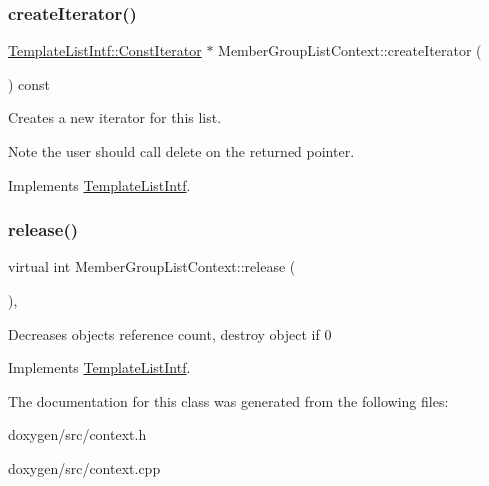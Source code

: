 \subsubsection{\texorpdfstring{createIterator()}{createIterator()}}
{\footnotesize\ttfamily \mbox{\hyperlink{class_template_list_intf_1_1_const_iterator}{Template\+List\+Intf\+::\+Const\+Iterator}} $\ast$ Member\+Group\+List\+Context\+::create\+Iterator (\begin{DoxyParamCaption}{ }\end{DoxyParamCaption}) const\hspace{0.3cm}{\ttfamily [virtual]}}

Creates a new iterator for this list. \begin{DoxyNote}{Note}
the user should call delete on the returned pointer. 
\end{DoxyNote}


Implements \mbox{\hyperlink{class_template_list_intf_a56b82384db24c3e121076a1da046d378}{Template\+List\+Intf}}.

\mbox{\label{class_member_group_list_context_afc46c3c1646126f13c4357c4800a5fe0}} 
\subsubsection{\texorpdfstring{release()}{release()}}
{\footnotesize\ttfamily virtual int Member\+Group\+List\+Context\+::release (\begin{DoxyParamCaption}{ }\end{DoxyParamCaption})\hspace{0.3cm}{\ttfamily [inline]}, {\ttfamily [virtual]}}

Decreases object\textquotesingle{}s reference count, destroy object if 0 

Implements \mbox{\hyperlink{class_template_list_intf_a0c53169c740c09dac47efc62bbe39674}{Template\+List\+Intf}}.



The documentation for this class was generated from the following files\+:\begin{DoxyCompactItemize}
\item 
doxygen/src/context.\+h\item 
doxygen/src/context.\+cpp\end{DoxyCompactItemize}
